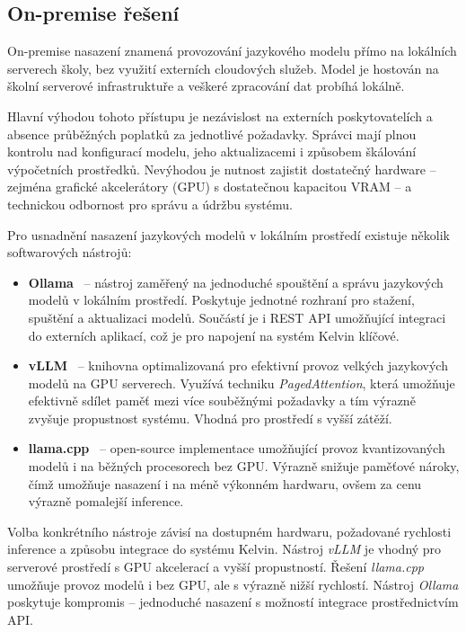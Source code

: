 \subsection{On-premise řešení}
\label{subsec:deployment-on-premise}

On-premise nasazení znamená provozování jazykového modelu přímo na lokálních serverech školy, bez využití externích cloudových služeb.
Model je hostován na školní serverové infrastruktuře a veškeré zpracování dat probíhá lokálně.

Hlavní výhodou tohoto přístupu je nezávislost na externích poskytovatelích a absence průběžných poplatků za jednotlivé požadavky.
Správci mají plnou kontrolu nad konfigurací modelu, jeho aktualizacemi i způsobem škálování výpočetních prostředků.
Nevýhodou je nutnost zajistit dostatečný hardware -- zejména grafické akcelerátory (GPU) s dostatečnou kapacitou VRAM -- a technickou odbornost pro správu a údržbu systému.

Pro usnadnění nasazení jazykových modelů v lokálním prostředí existuje několik softwarových nástrojů:

\begin{itemize}
    \item \textbf{Ollama}~\cite{ollama} -- nástroj zaměřený na jednoduché spouštění a správu jazykových modelů v lokálním prostředí.
    Poskytuje jednotné rozhraní pro stažení, spuštění a aktualizaci modelů.
    Součástí je i REST API umožňující integraci do externích aplikací, což je pro napojení na systém Kelvin klíčové.

    \item \textbf{vLLM}~\cite{vllm} -- knihovna optimalizovaná pro efektivní provoz velkých jazykových modelů na GPU serverech.
    Využívá techniku \textit{PagedAttention}, která umožňuje efektivně sdílet paměť mezi více souběžnými požadavky a tím výrazně zvyšuje propustnost systému.
    Vhodná pro prostředí s vyšší zátěží.

    \item \textbf{llama.cpp}~\cite{llamacpp} -- open-source implementace umožňující provoz kvantizovaných modelů i na běžných procesorech bez GPU\@.
    Výrazně snižuje paměťové nároky, čímž umožňuje nasazení i na méně výkonném hardwaru, ovšem za cenu výrazně pomalejší inference.
\end{itemize}

Volba konkrétního nástroje závisí na dostupném hardwaru, požadované rychlosti inference a způsobu integrace do systému Kelvin.
Nástroj \textit{vLLM} je vhodný pro serverové prostředí s GPU akcelerací a vyšší propustností.
Řešení \textit{llama.cpp} umožňuje provoz modelů i bez GPU, ale s výrazně nižší rychlostí.
Nástroj \textit{Ollama} poskytuje kompromis -- jednoduché nasazení s možností integrace prostřednictvím API\@.


